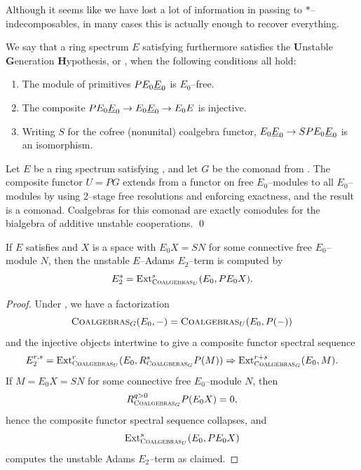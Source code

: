Although it seems like we have lost a lot of information in passing to \(\ast\)--indecomposables, in many cases this is actually enough to recover everything.


\begin{definition}
We say that a ring spectrum \(E\) satisfying {\UFH} furthermore satisfies the \textbf{U}nstable \textbf{G}eneration \textbf{H}ypothesis, or , when the following conditions all hold:
\begin{enumerate}
    \item The module of primitives \(P E_0 \OS{E}{0}\) is \(E_0\)--free.
    \item The composite \(P E_0 \OS{E}{0} \to E_0 \OS{E}{0} \to E_0 E\) is injective.
    \item Writing \(S\) for the cofree (nonunital) coalgebra functor, \(E_0 \OS{E}{0} \to SP E_0 \OS{E}{0}\) is an isomorphism.
\end{enumerate}
\end{definition}

\begin{lemma}\label{ShorterUnstableResns}
Let \(E\) be a ring spectrum satisfying {\UGH}, and let \(G\) be the comonad from .
The composite functor \(U = P G\) extends from a functor on free \(E_0\)--modules to all \(E_0\)--modules by using \(2\)--stage free resolutions and enforcing exactness, and the result is a comonad.
Coalgebras for this comonad are exactly comodules for the bialgebra of additive unstable cooperations. \qed
\end{lemma}

\begin{corollary}
If \(E\) satisfies {\UGH} and \(X\) is a space with \(E_0 X = SN\) for some connective free \(E_0\)--module \(N\), then the unstable \(E\)--Adams \(E_2\)--term is computed by \[E_2^s = \operatorname{Ext}^s_{\normalfont\textsc{Coalgebras}_U}(E_0, P E_0 X).\]
\end{corollary}
\begin{proof}
Under {\UGH}, we have a factorization \[\normalfont\textsc{Coalgebras}_{G}(E_0, -) = \normalfont\textsc{Coalgebras}_{U}(E_0, P(-))\] and the injective objects intertwine to give a composite functor spectral sequence \[E_2^{r, s} = \operatorname{Ext}^r_{\normalfont\textsc{Coalgebras}_U}(E_0, R^s_{\normalfont\textsc{Coalgberas}_G} P(M)) \Rightarrow \operatorname{Ext}^{r+s}_{\normalfont\textsc{Coalgebras}_G}(E_0, M).\]
If \(M = E_0 X = SN\) for some connective free \(E_0\)--module \(N\), then \[R^{q > 0}_{\normalfont\textsc{Coalgebras}_G} P(E_0 X) = 0,\] hence the composite functor spectral sequence collapses, and \[\operatorname{Ext}^s_{\normalfont\textsc{Coalgebras}_U}(E_0, P E_0 X)\] computes the unstable Adams \(E_2\)--term as claimed.
\end{proof}

